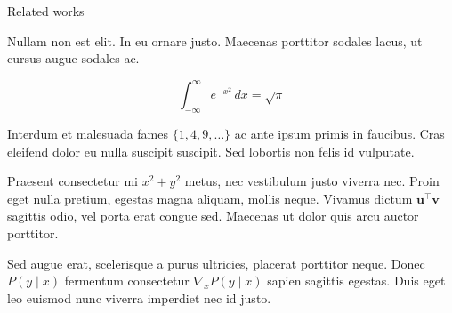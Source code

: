 \begin{block}{Related works}

Nullam non est elit. In eu ornare justo. Maecenas porttitor sodales lacus,
ut cursus augue sodales ac.

$$
\int_{-\infty}^{\infty} e^{-x^2}\,dx = \sqrt{\pi}
$$

Interdum et malesuada fames $\{1, 4, 9, \ldots\}$ ac ante ipsum primis in
faucibus. Cras eleifend dolor eu nulla suscipit suscipit. Sed lobortis non
felis id vulputate.


Praesent consectetur mi $x^2 + y^2$ metus, nec vestibulum justo viverra
nec. Proin eget nulla pretium, egestas magna aliquam, mollis neque. Vivamus
dictum $\mathbf{u}^\intercal\mathbf{v}$ sagittis odio, vel porta erat
congue sed. Maecenas ut dolor quis arcu auctor porttitor.


Sed augue erat, scelerisque a purus ultricies, placerat porttitor neque.
Donec $P(y \mid x)$ fermentum consectetur $\nabla_x P(y \mid x)$ sapien
sagittis egestas. Duis eget leo euismod nunc viverra imperdiet nec id
justo.

\end{block}
